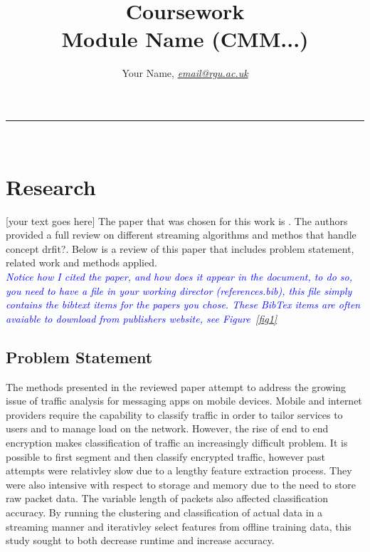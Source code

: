 \documentclass[10pt]{article}
\begin{document}



\title{\LARGE Coursework  \\ Module Name (CMM...)}

\author{Your Name, \textit{\href{email@rgu.ac.uk}{email@rgu.ac.uk}}}
\maketitle
\noindent\rule{16cm}{0.4pt}
\ \\

\section{Research}

[your text goes here]
The paper that was chosen for this work is \cite{6779381}. The authors provided a full review on different streaming algorithms and methos that handle concept drfit?. Below is a review of this paper that includes problem statement, related work and methods applied.\\

\textcolor{blue}{\textit{Notice how I cited the paper, and how does it appear in the document, to do so, you need to have a file in your working director (references.bib), this file simply contains the bibtext items for the papers you chose. These BibTex items are often avaiable to download from publishers website, see Figure~\ref{fig1}}}
\subsection{Problem Statement}

The methods presented in the reviewed paper attempt to address the growing issue of traffic analysis for messaging apps on mobile devices. Mobile and internet providers require the capability to classify traffic in order to tailor services to users and to manage load on the network. However, the rise of end to end encryption makes classification of traffic an increasingly difficult problem. It is possible to first segment and then classify encrypted traffic, however past attempts were relativley slow due to a lengthy feature extraction process. They were also intensive with respect to storage and memory due to the need to store raw packet data. The variable length of packets also affected classification accuracy. By running the clustering and classification of actual data in a streaming manner and iterativley select features from offline training data, this study sought to both decrease runtime and increase accuracy.
\end{document}
